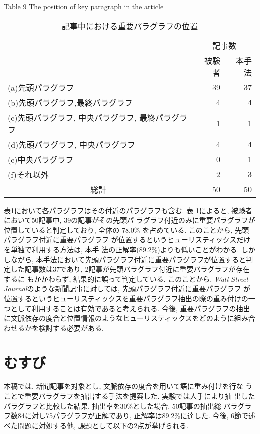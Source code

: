 {\footnotesize
\begin{table}[htbp]
\begin{center}
\caption{記事中における重要パラグラフの位置} \label{position1}
\vspace*{-3mm}
Table 9 The position of key paragraph in the article
\begin{tabular}{l||r|r} \hline \hline
 &\multicolumn{2}{|c}{記事数} \\ \cline{2-3}
 &被験者 &本手法 \\ \hline
(a)先頭パラグラフ &39 &37 \\ \hline
(b)先頭パラグラフ,最終パラグラフ &4 &4 \\ \hline
(c)先頭パラグラフ, 中央パラグラフ, 最終パラグラフ &1 &1 \\ \hline
(d)先頭パラグラフ, 中央パラグラフ &4 &4 \\ \hline
(e)中央パラグラフ &0 &1 \\ \hline
(f)それ以外 &2 &3 \\ \hline
\multicolumn{1}{c||}{総計} &50 &50 \\ \hline
\end{tabular}
\end{center}
\end{table}
}


\noindent
表\ref{position1}において各パラグラフはその付近のパラグラフも含む. 表
\ref{position1}によると, 被験者において50記事中, 39の記事がその先頭パ
ラグラフ付近のみに重要パラグラフが位置していると判定しており, 全体の
78.0\% を占めている.  このことから, 先頭パラグラフ付近に重要パラグラフ
が位置するというヒューリスティックスだけを単独で利用する方法は, 本手
法の正解率(89.2\%)よりも低いことがわかる.  しかしながら, 本手法において先頭パラグラフ付近に重要パラグラフが位置すると判定した記事数は37であり, 2記事が先頭パラグラフ付近に重要パラグラフが存在するに
もかかわらず, 結果的に誤って判定している.  このことから, {\it Wall
Street Journal}のような新聞記事に対しては, 先頭パラグラフ付近に重要パラグラフ
が位置するというヒューリスティックスを重要パラグラフ抽出の際の重み付けの一つとして利用することは有効であると考えられる.  今後, 重要パラグラフの抽出に文脈依存の度合と位置情報のようなヒューリスティックスをどのように組み合わせるかを検討する必要がある.

\section{むすび}

本稿では, 新聞記事を対象とし, 文脈依存の度合を用いて語に重み付けを行な
うことで重要パラグラフを抽出する手法を提案した.  実験では人手により抽
出したパラグラフと比較した結果, 抽出率を30\%とした場合, 50記事の抽出総
パラグラフ数84に対し75パラグラフが正解であり, 正解率は89.2\%に達した.
今後, 6節で述べた問題に対処する他, 課題として以下の2点が挙げられる.

